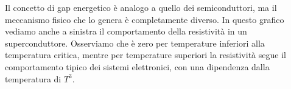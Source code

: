 Il concetto di gap energetico è analogo a quello dei semiconduttori, ma il meccanismo fisico che lo genera è completamente diverso.
In questo grafico vediamo anche a sinistra il comportamento della resistività in un superconduttore. Osserviamo che è zero per temperature inferiori alla temperatura critica, mentre per temperature superiori la resistività segue il comportamento tipico dei sistemi elettronici, con una dipendenza dalla temperatura di $T^3$.
